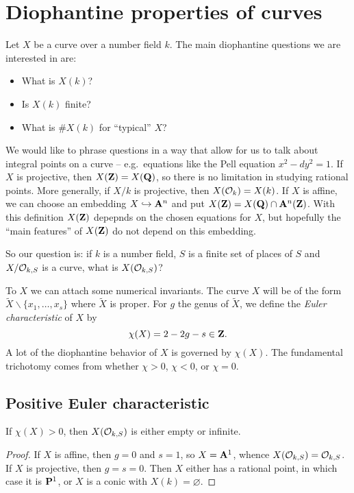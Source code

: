 
\section{Diophantine properties of curves}\label{sec:7}





Let $X$ be a curve over a number field $k$. The main diophantine questions we 
are interested in are: 
\begin{itemize}
  \item What is $X(k)$?
  \item Is $X(k)$ finite?
  \item What is $\# X(k)$ for ``typical'' $X$?
\end{itemize}
We would like to phrase questions in a way that allow for us to talk about 
integral points on a curve -- e.g.~equations like the Pell equation 
$x^2-d y^2=1$. If $X$ is projective, then $X(\mathbf{Z})=X(\mathbf{Q})$, so there is no 
limitation in studying rational points. More generally, if $X/k$ is 
projective, then $X(\mathcal{O}_k)=X(k)$. If $X$ is affine, we can choose an 
embedding $X\hookrightarrow \mathbf{A}^n$ and put $X(\mathbf{Z})=X(\mathbf{Q})\cap \mathbf{A}^n(\mathbf{Z})$. 
With this definition $X(\mathbf{Z})$ depepnds on the chosen equations for $X$, but 
hopefully the ``main features'' of $X(\mathbf{Z})$ do not depend on this embedding. 

So our question is: if $k$ is a number field, $S$ is a finite set of places of 
$S$ and $X/\mathcal{O}_{k,S}$ is a curve, what is $X(\mathcal{O}_{k,S})$? 

To $X$ we can attach some numerical invariants. The curve $X$ will be of the 
form $\widetilde X\smallsetminus \{x_1,\dots,x_s\}$ where $\widetilde X$ is 
proper. For $g$ the genus of $\widetilde X$, we define the 
\emph{Euler characteristic} of $X$ by 
\[
  \chi(X) = 2 - 2 g - s\in \mathbf{Z} .
\]
A lot of the diophantine behavior of $X$ is governed by $\chi(X)$. The 
fundamental trichotomy comes from whether $\chi>0$, $\chi<0$, or 
$\chi=0$. 





\subsection{Positive Euler characteristic}

\begin{theo}
If $\chi(X)>0$, then $X(\mathcal{O}_{k,S})$ is either empty or infinite. 
\end{theo}
\begin{proof}
If $X$ is affine, then $g=0$ and $s=1$, so $X=\mathbf{A}^1$, whence 
$X(\mathcal{O}_{k,S}) = \mathcal{O}_{k,S}$. If $X$ is projective, then $g=s=0$. Then $X$ 
either has a rational point, in which case it is $\mathbf{P}^1$, or $X$ is a conic 
with $X(k)=\varnothing$. 
\end{proof}

